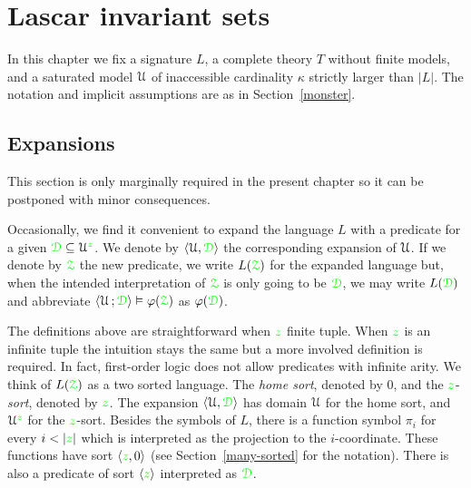 \chapter{Lascar invariant sets}
\label{invariantL}

\def\medrel#1{\parbox[t]{6ex}{$\displaystyle\hfil #1$}}
\def\ceq#1#2#3{\parbox[t]{18ex}{$\displaystyle #1$}\medrel{#2}{$\displaystyle #3$}}

\def\mr{\color{brown}}
\def\gr{\color{green}}

In this chapter we fix a signature $L$, a complete theory $T$ without finite models, and a saturated model $\EuScript U$ of inaccessible cardinality $\kappa$ strictly larger than $|L|$.
The notation and implicit assumptions are as in Section~\ref{monster}.

\section{Expansions}
\label{expansions}

\def\ceq#1#2#3{\parbox[t]{16ex}{$\displaystyle #1$}\medrel{#2}{$\displaystyle #3$}}

This section is only marginally required in the present chapter so it can be postponed with minor consequences.

Occasionally, we find it convenient to expand the language $L$ with a predicate for a given $\grD\subseteq\U^{\gr z}$.
We denote by $\<\U,\grD\>$ the corresponding expansion of $\EuScript U$.
If we denote by $\grZ$ the new predicate, we write \emph{$L(\grZ)$} for the expanded language but, when the intended interpretation of $\grZ$ is only going to be $\grD$, we may write \emph{$L(\grD)$} and abbreviate $\<\U\,;\grD\>\models\phi(\grZ)$ as $\phi(\grD)$. 


\begin{remark}
The definitions above are straightforward when ${\gr z}$ finite tuple.
When ${\gr z}$ is an infinite tuple the intuition stays the same but a more involved definition is required.
In fact, first-order logic does not allow predicates with infinite arity.
We think of $L(\grZ)$ as a two sorted language.
The \textit{home sort}, denoted by $0$, and the ${\gr z}$-\textit{sort}, denoted by ${\gr z}$.
The expansion $\<\U,\grD\>$ has domain $\EuScript U$ for the home sort, and $\U^{\gr z}$ for the ${\gr z}$-sort.
Besides the symbols of $L$, there is a function symbol $\pi_i$ for every $i<|{\gr z}|$ which is interpreted as the projection to the $i$-coordinate.
These functions have sort $\<{\gr z},0\>$ (see Section~\ref{many-sorted} for the notation).
There is also a predicate of sort $\<{\gr z}\>$ interpreted as $\grD$.
\end{remark}

